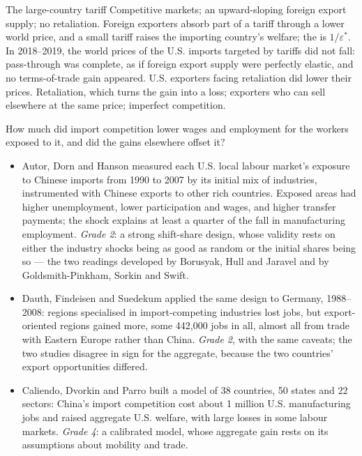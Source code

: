 \begin{model}{The large-country tariff}
\assumes Competitive markets; an upward-sloping foreign export supply; no
retaliation.
\predicts Foreign exporters absorb part of a tariff through a lower world price,
and a small tariff raises the importing country's welfare; the  is
$1/\varepsilon^*$.
\tested In 2018--2019, the world prices of the U.S. imports targeted by tariffs did not
fall: pass-through was complete, as if foreign export supply were perfectly
elastic, and no terms-of-trade gain appeared. U.S. exporters facing retaliation
did lower their prices. %
\breaks Retaliation, which turns the gain into a loss; exporters who can sell
elsewhere at the same price; imperfect competition.
\end{model}

\begin{debate}
How much did import competition lower wages and employment for the workers exposed
to it, and did the gains elsewhere offset it?
\begin{itemize}
\item Autor, Dorn and Hanson measured each U.S. local labour market's exposure to
Chinese imports from 1990 to 2007 by its initial mix of industries, instrumented
with Chinese exports to other rich countries. Exposed areas had higher
unemployment, lower participation and wages, and higher transfer payments; the
shock explains at least a quarter of the fall in manufacturing employment.
\emph{Grade 2}: a strong shift-share design, whose validity rests on either the
industry shocks being as good as random or the initial shares being so --- the
two readings developed by Borusyak, Hull and Jaravel and by Goldsmith-Pinkham,
Sorkin and Swift. %
\item Dauth, Findeisen and Suedekum applied the same design to Germany, 1988--2008:
regions specialised in import-competing industries lost jobs, but export-oriented
regions gained more, some 442{,}000 jobs in all, almost all from trade with
Eastern Europe rather than China. %
\emph{Grade 2}, with the same caveats; the two studies disagree in sign for the
aggregate, because the two countries' export opportunities differed.
\item Caliendo, Dvorkin and Parro built a model of 38 countries, 50 states and 22
sectors: China's import competition cost about 1 million U.S. manufacturing jobs
and raised aggregate U.S. welfare, with large losses in some labour markets.
\emph{Grade 4}: a calibrated model, whose aggregate gain rests on its assumptions
about mobility and trade.
\end{itemize}
\end{debate}

